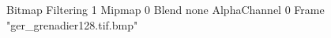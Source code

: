 {Bitmap
	{Filtering 1}
	{Mipmap 0}
	{Blend none}
	{AlphaChannel 0}
	{Frame "ger_grenadier128.tif.bmp"}
}
